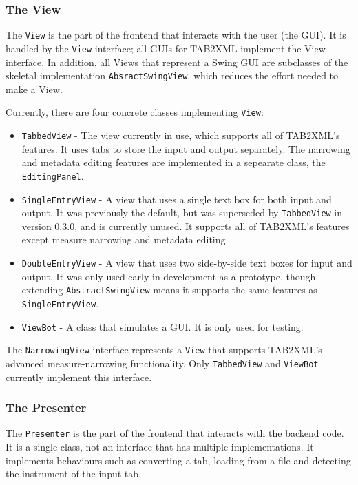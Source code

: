 \documentclass[11pt]{article}
\begin{document}
\subsubsection{The View}
\label{sec:org341ff88}
The \texttt{View} is the part of the frontend that interacts with the user (the GUI).  It is handled by the \texttt{View} interface; all GUIs for TAB2XML implement the View interface.  In addition, all Views that represent a Swing GUI are subclasses of the skeletal implementation \texttt{AbsractSwingView}, which reduces the effort needed to make a View.

Currently, there are four concrete classes implementing \texttt{View}:
\begin{itemize}
\item \texttt{TabbedView} - The view currently in use, which supports all of TAB2XML's features.  It uses tabs to store the input and output separately.  The narrowing and metadata editing features are implemented in a sepearate class, the \texttt{EditingPanel}.
\item \texttt{SingleEntryView} - A view that uses a single text box for both input and output.  It was previously the default, but was superseded by \texttt{TabbedView} in version 0.3.0, and is currently unused.  It supports all of TAB2XML's features except measure narrowing and metadata editing.
\item \texttt{DoubleEntryView} - A view that uses two side-by-side text boxes for input and output.  It was only used early in development as a prototype, though extending \texttt{AbstractSwingView} means it supports the same features as \texttt{SingleEntryView}.
\item \texttt{ViewBot} - A class that simulates a GUI.  It is only used for testing.
\end{itemize}

The \texttt{NarrowingView} interface represents a \texttt{View} that supports TAB2XML's advanced measure-narrowing functionality.  Only \texttt{TabbedView} and \texttt{ViewBot} currently implement this interface.
\subsubsection{The Presenter}
\label{sec:orgc1e57a2}
The \texttt{Presenter} is the part of the frontend that interacts with the backend code.  It is a single class, not an interface that has multiple implementations.  It implements behaviours such as converting a tab, loading from a file and detecting the instrument of the input tab.
\end{document}

